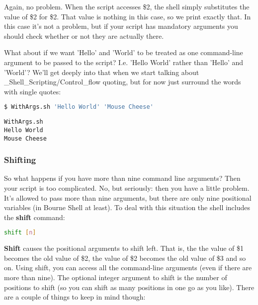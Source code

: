 Again, no problem. When the script accesses \$2, the shell simply substitutes
the value of \$2 for \$2. That value is nothing in this case, so we print
exactly that. In this case it's not a problem, but if your script has mandatory
arguments you should check whether or not they are actually there.

What about if we want 'Hello' and 'World' to be treated as one command-line
argument to be passed to the script? I.e. 'Hello World' rather than 'Hello' and
'World'? We'll get deeply into that when we start talking about
\_Shell\_Scripting/Control\_flow quoting, but for now just surround the
words with single quotes:
\lstset{basicstyle=\scriptsize, numbers=left, captionpos=b, tabsize=4}
\begin{lstlisting}[caption=Calling the script with multi-word arguments,language={bash},
xleftmargin=15pt,label=lst:Calling the script with multi-word arguments]
$ WithArgs.sh 'Hello World' 'Mouse Cheese'
\end{lstlisting}
\scriptsize
\begin{verbatim}
WithArgs.sh
Hello World
Mouse Cheese
\end{verbatim}
\normalsize

\subsubsection{Shifting}
So what happens if you have more than nine command line arguments? Then your
script is too complicated. No, but seriously: then you have a little problem.
It's allowed to pass more than nine arguments, but there are only nine
positional variables (in Bourne Shell at least). To deal with this situation
the shell includes the \textbf{shift} command:

\lstset{basicstyle=\scriptsize, numbers=left, captionpos=b, tabsize=4}
\begin{lstlisting}[language={bash},xleftmargin=15pt]
shift [n]
\end{lstlisting}

\textbf{Shift} causes the positional arguments to shift left. That is, the
the value of \$1 becomes the old value of \$2, the value of \$2 becomes the old
value of \$3 and so on. Using shift, you can access all the command-line
arguments (even if there are more than nine). The optional integer argument to
shift is the number of positions to shift (so you can shift as many positions
in one go as you like). There are a couple of things to keep in mind though:

